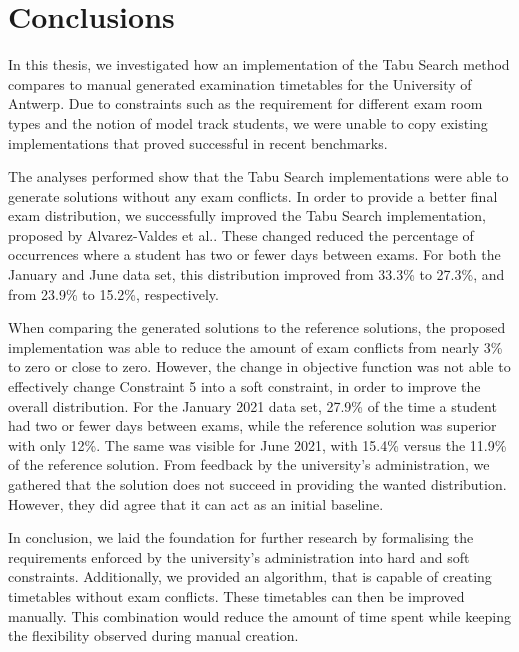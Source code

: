 
\section{Conclusions}\label{sec:conclusion}

 In this thesis, we investigated how an implementation of the Tabu Search method compares to manual generated examination timetables for the University of Antwerp. Due to constraints such as the requirement for different exam room types and the notion of model track students, we were unable to copy existing implementations that proved successful in recent benchmarks. 

 The analyses performed show that the Tabu Search implementations were able to generate solutions without any exam conflicts. In order to provide a better final exam distribution, we successfully improved the Tabu Search implementation, proposed by Alvarez-Valdes et al.\cite{alvarez1997}. These changed reduced the percentage of occurrences where a student has two or fewer days between exams. For both the January and June data set, this distribution improved from 33.3\% to 27.3\%, and from 23.9\% to 15.2\%, respectively.
 
When comparing the generated solutions to the reference solutions, the proposed implementation was able to reduce the amount of exam conflicts from nearly 3\% to zero or close to zero. However, the change in objective function was not able to effectively change Constraint 5 into a soft constraint, in order to improve the overall distribution. For the January 2021 data set, 27.9\% of the time a student had two or fewer days between exams, while the reference solution was superior with only 12\%. The same was visible for June 2021, with 15.4\% versus the 11.9\% of the reference solution. From feedback by the university's administration, we gathered that the solution does not succeed in providing the wanted distribution. However, they did agree that it can act as an initial baseline.

In conclusion, we laid the foundation for further research by formalising the requirements enforced by the university's administration into hard and soft constraints. Additionally, we provided an algorithm, that is capable of creating timetables without exam conflicts. These timetables can then be improved manually. This combination would reduce the amount of time spent while keeping the flexibility observed during manual creation.

